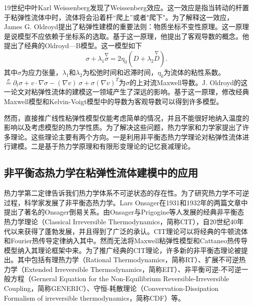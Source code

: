 \documentclass{article}
\begin{document}
19世纪中叶Karl Weissenberg发现了Weissenberg效应。这一效应是指当转动的杆置于粘弹性流体中时，流体将会沿着杆“爬上”或者"爬下"\cite{}。为了解释这一效应，James G. Oldroyd提出了粘弹性建模的重要法则：物质坐标不变性原理。这一原理是说模型不应依赖于坐标系的选取。基于这一原理，他提出了客观导数的概念。他提出了经典的Oldroyd—B模型。这一模型如下
\begin{equation} \label{eq：Oldroyd}
	{\sigma} + \lambda_1 \stackrel{\nabla}{{\sigma}} = 2\eta_0 ({D} + \lambda_2 \stackrel{\nabla}{{D}}).
\end{equation}
其中$\sigma$为应力张量，$\lambda_1$和$\lambda_2$为松弛时间和迟滞时间，$\eta_0$为流体的粘性系数。$\stackrel{\sigma} = \partial_t \sigma + v \cdot \nabla \sigma - (\nabla v)\  \sigma + \sigma (\nabla v)^T$为$\sigma$的上对流Maxwell导数\cite{}。J. Oldroyd的这一论文对粘弹性流体的建模这一领域产生了深远的影响。基于这一原理，修改经典Maxwell模型和Kelvin-Voigt模型中的导数为客观导数可以得到许多模型\cite{}。

然而，直接推广线性粘弹性模型仅能考虑简单的情况，并且不能很好地纳入温度的影响以及考虑模型的热力学性质。为了解决这些问题，热力学家和力学家提出了许多理论。这些理论主要有两个方向。一是利用非平衡态热力学理论对粘弹性流体进行建模\cite{}。二是基于热力学原理和有限形变理论的记忆衰减理论\cite{}。

\subsection{非平衡态热力学在粘弹性流体建模中的应用}
热力学第二定律告诉我们热力学体系不可逆状态的存在性。为了研究热力学不可逆过程，科学家发展了非平衡态热力学。Lars Onsager在1931和1932年的两篇文章中提出了著名的Onsager倒易关系\cite{}。由Onsager与Prigogine等人发展的经典非平衡态热力学理论（Classical Irreversible Thermodynamics，简称CIT），自20世纪40年代以来获得了蓬勃发展，并且得到了广泛的承认\cite{}。CIT理论可以将经典的牛顿流体和Fourier热传导定律纳入其中。然而无法将Maxwell粘弹性模型和Cattaneo热传导模型纳入其理论框架中来。为了推广经典的CIT理论，许多新的非平衡态理论被提出。其中包括有理热力学（Rational Thermodynamics，简称RT）、扩展不可逆热力学（Extended Irreversible Thermodynamics，简称EIT）、非平衡可逆-不可逆一般方程（Gerneral Equation for the Non-Equilibrium Reversible-Irreversible Coupling，简称GENERIC）、守恒-耗散理论（Convervation-Dissipation Formalism of irreversible thermodynamics，简称CDF）等\cite{}。
\end{document}
